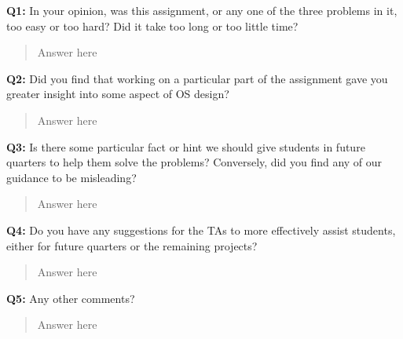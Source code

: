 \documentclass[a4paper,11pt]{paper}
\begin{document}
\textbf{Q1:} In your opinion, was this assignment, or any one of the three problems in it, too easy or too hard?  Did it take too long or too little time?
\begin{quote}
  Answer here
\end{quote}

\textbf{Q2:} Did you find that working on a particular part of the assignment gave you greater insight into some aspect of OS design?
\begin{quote}
  Answer here
\end{quote}

\textbf{Q3:} Is there some particular fact or hint we should give students in future quarters to help them solve the problems?  Conversely, did you find any of our guidance to be misleading?
\begin{quote}
  Answer here
\end{quote}

\textbf{Q4:} Do you have any suggestions for the TAs to more effectively assist students, either for future quarters or the remaining projects?
\begin{quote}
  Answer here
\end{quote}

\textbf{Q5:} Any other comments?
\begin{quote}
  Answer here
\end{quote}
\end{document}
